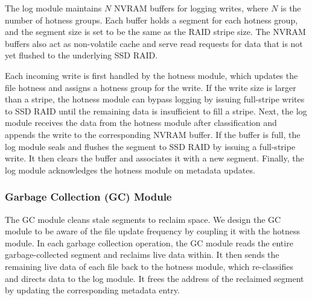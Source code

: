 The log module maintains $N$ NVRAM buffers for logging writes, where $N$ is
the number of hotness groups.  Each buffer holds a segment for each hotness
group, and the segment size is set to be the same as the RAID stripe size.
The NVRAM buffers also act as non-volatile cache and serve read requests for
data that is not yet flushed to the underlying SSD RAID.


Each incoming write is first handled by the hotness module, which updates the
file hotness and assigns a hotness group for the write. If the write size is
larger than a stripe, the hotness module can bypass logging by issuing
full-stripe writes to SSD RAID until the remaining data is insufficient to fill 
a stripe. Next, the log module receives the data from the hotness module after
classification and appends the write to the corresponding NVRAM buffer.  If
the buffer is full, the log module seals and flushes the segment to SSD RAID
by issuing a full-stripe write.  It then clears the buffer and associates it
with a new segment. Finally, the log module acknowledges the hotness module
on metadata updates.

\subsubsection{Garbage Collection (GC) Module}
\label{subsubsec:gcmod}



The GC module cleans stale segments to reclaim space.  We design the GC module
to be aware of the file update frequency by coupling it with the hotness module.
In each garbage collection operation, the GC module reads the entire
garbage-collected segment and reclaims live data within.  It then sends the
remaining live data of each file back to the hotness module, which re-classifies
and directs data to the log module. It frees the address of the reclaimed
segment by updating the corresponding metadata entry.

